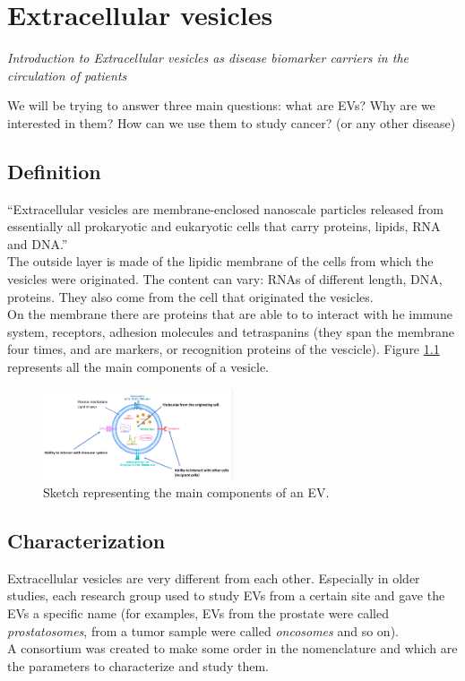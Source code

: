 \graphicspath{{chapters/notes/09/images/}}
\chapter{Extracellular vesicles}
\emph{Introduction to Extracellular vesicles as disease biomarker carriers in the circulation of patients}

We will be trying to answer three main questions: what are EVs? Why are we interested in them? How can we use them to study cancer? (or any other disease)

\section{Definition}
“Extracellular vesicles are membrane-enclosed nanoscale particles released from essentially all prokaryotic and eukaryotic cells that carry proteins, lipids, RNA and DNA.”
\\
The outside layer is made of the lipidic membrane of the cells from which the vesicles were originated.
The content can vary: RNAs of different length, DNA, proteins. They also come from the cell that originated the vesicles.\\
On the membrane there are proteins that are able to to interact with he immune system, receptors, adhesion molecules and tetraspanins (they span the membrane four times, and are markers, or recognition proteins of the vescicle).
Figure \ref{fig:ev1} represents all the main components of a vesicle.
\begin{figure}[H]
    \centering
    \includegraphics[width=0.5\textwidth]{ev1.png}
    \caption{Sketch representing the main components of an EV.}
    \label{fig:ev1}
\end{figure}

\section{Characterization}
Extracellular vesicles are very different from each other.
Especially in older studies, each research group used to study EVs from a certain site and gave the EVs a specific name (for examples, EVs from the prostate were called \textit{prostatosomes}, from a tumor sample were called \textit{oncosomes} and so on).
\\
A consortium was created to make some order in the nomenclature and which are the parameters to characterize and study them.

